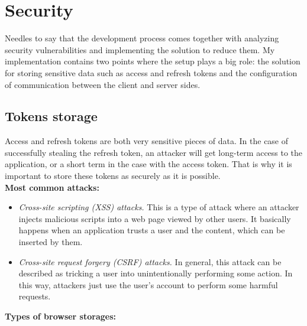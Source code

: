 \section{Security} Needles to say that the development process comes together with analyzing security vulnerabilities and implementing the solution to reduce them. My implementation contains two points where the setup plays a big role: the solution for storing sensitive data such as access and refresh tokens and the configuration of communication between the client and server sides.


\subsection{Tokens storage} Access and refresh tokens are both very sensitive pieces of data. In the case of successfully stealing the refresh token, an attacker will get long-term access to the application, or a short term in the case with the access token. That is why it is important to store these tokens as securely as it is possible.\\

\noindent \textbf{Most common attacks: }\cite{attacks}

\begin{itemize}
    \item \emph{Cross-site scripting (XSS) attacks.} This is a type of attack where an attacker injects malicious scripts into a web page viewed by other users. It basically happens when an application trusts a user and the content, which can be inserted by them. 
    \item \emph{Cross-site request forgery (CSRF) attacks.} In general, this attack can be described as tricking a user into unintentionally performing some action. In this way, attackers just use the user's account to perform some harmful requests.
\end{itemize}


\noindent \textbf{Types of browser storages: }\cite{storages} 

